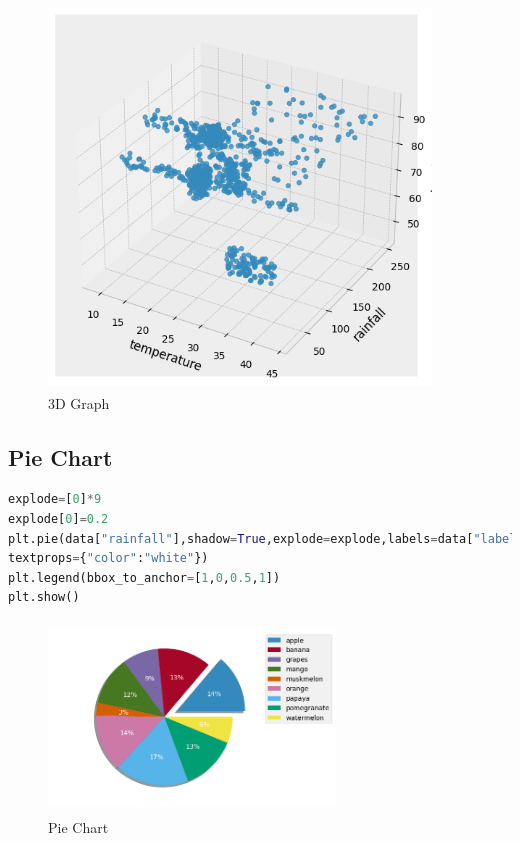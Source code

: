 \begin{figure}[h]
\centering
 \footnotesize
 \includegraphics[width=4in,height=4in]{3D graph.png}
\caption{3D Graph}
\label{fig:unevenlight}
\end{figure} 
\vspace{2\baselineskip}
\subsection{Pie Chart}
\begin{lstlisting}[language=Python,basicstyle=\fontsize{9}{11}\selectfont]
explode=[0]*9
explode[0]=0.2
plt.pie(data["rainfall"],shadow=True,explode=explode,labels=data["label"],autopct="%1.0f%%",
textprops={"color":"white"})
plt.legend(bbox_to_anchor=[1,0,0.5,1])
plt.show()
\end{lstlisting}
 
\begin{figure}[h]
\centering
 \footnotesize
 \includegraphics[width=3in,height=2in]{piechart.png}
\caption{Pie Chart}
\label{fig:unevenlight}
\end{figure} 
